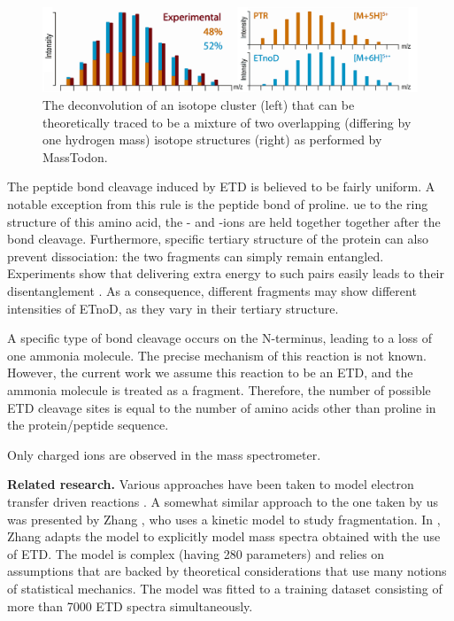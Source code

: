 \documentclass{llncs}
\begin{document}
        \begin{figure}[h]
                \center
                \includegraphics[width=.8\textwidth]{masstodon.png}
                \caption{The deconvolution of an isotope cluster (left) that can be theoretically traced to be a mixture of two overlapping (differing by one hydrogen mass) isotope structures (right) as performed by MassTodon.}\label{img::masstodon}
        \end{figure}

        The peptide bond cleavage induced by ETD is believed to be fairly uniform. A notable exception from this rule is the peptide bond of proline. ue to the ring structure of this amino acid, the - and -ions are held together together after the  bond cleavage.  Furthermore,  specific tertiary structure of the protein can also prevent dissociation: the two fragments can simply remain entangled. Experiments show that delivering extra energy to such pairs easily leads to their disentanglement \cite{Lermyte2017-zt}. As a consequence, different fragments may show different intensities of ETnoD, as they vary in their tertiary structure.

        A specific type of  bond cleavage occurs on the N-terminus, leading to a loss of one ammonia molecule. The precise mechanism of this reaction is not known. However, the current work we assume this reaction to be an ETD, and the ammonia molecule is treated as a  fragment. Therefore, the number of possible ETD cleavage sites is equal to the number of amino acids other than proline in the protein/peptide sequence.

        Only charged ions are observed in the mass spectrometer.

\textbf{Related research.}
        Various approaches have been taken to model electron transfer driven reactions \cite{Breuker2004-az,Simons2010-gy,Zhurov2013-ls,Turecek2013-fq}. A somewhat similar approach to the one taken by us was presented by Zhang \cite{Zhang2004-fp,Zhang2005-jn,Zhang2011-lg}, who uses a kinetic model to study fragmentation. In \cite{Zhang2010-fp}, Zhang adapts the model to explicitly model mass spectra obtained with the use of ETD. The model is complex (having 280 parameters) and relies on assumptions that are backed by theoretical considerations that use many notions of statistical mechanics. The model was fitted to a training dataset consisting of more than 7000 ETD spectra simultaneously.
\end{document}
